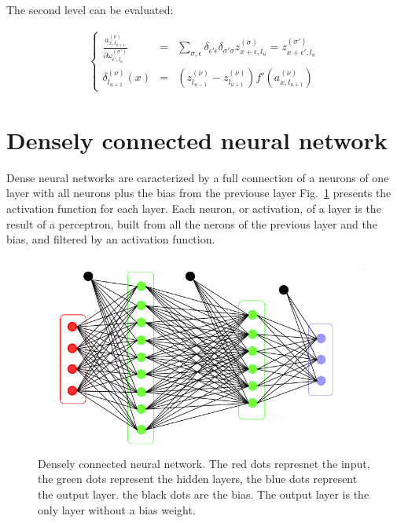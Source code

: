 \documentclass[final, paper=letter,5p,times,twocolumn]{elsarticle}
\begin{document}
The second level can be evaluated:

\begin{eqnarray*}
  \left \lbrace
  \begin{array}{rcl}
    \frac{a_{x,l_{u+1}}^{(\nu)}}{\partial \omega_{\epsilon',l_{u}}^{(\sigma')}} & = & \sum_{\sigma,\epsilon} \delta_{\epsilon' \epsilon} \delta_{\sigma' \sigma} z_{x+\epsilon,l_{u}}^{(\sigma)} = z_{x+\epsilon',l_{u}}^{(\sigma')} \\
    \delta_{l_{u+1}}^{(\nu)}(x) & = & \left( z_{l_{u-1}}^{(\nu)} - z_{l_{u+1}}^{(\nu)} \right) f'(a_{x,l_{u+1}}^{(\nu)})
  \end{array}
  \right .
\end{eqnarray*}
  


\section{Densely connected neural network}

Dense neural networks are caracterized by a full connection of a neurons of one layer with all neurons plus the bias from the previouse layer Fig.~\ref{fig:Densely_connected_neural_network} presents the activation function for each layer. Each neuron, or activation, of a layer is the result of a perceptron, built from all the nerons of the previous layer and the bias, and filtered by an activation function. 


\begin{figure}[htbp]
   \begin{center}
      \includegraphics[scale=0.3, angle=0]{images/densely_connected_nn.png}
   \end{center}
   \caption{Densely connected neural network. The red dots represnet the input, the green dots represent the hidden layers, the blue dots represent the output layer. the black dots are the bias. The output layer is the only layer without a bias weight.}
  \label{fig:Densely_connected_neural_network} 
\end{figure}
\end{document}
